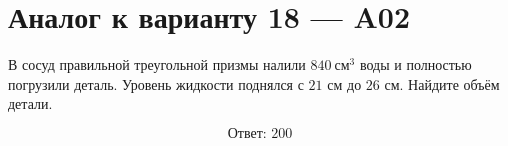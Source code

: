 \documentclass[12pt,a4paper]{article}
\begin{document}
\section*{Аналог к варианту 18 — A02}

В сосуд правильной треугольной призмы налили \(840\ \text{см}^3\) воды и полностью погрузили деталь. Уровень жидкости поднялся с \(21\) см до \(26\) см. Найдите объём детали.

\begin{center}
\end{center}

\[
\boxed{\text{Ответ: }200}
\]
\end{document}
